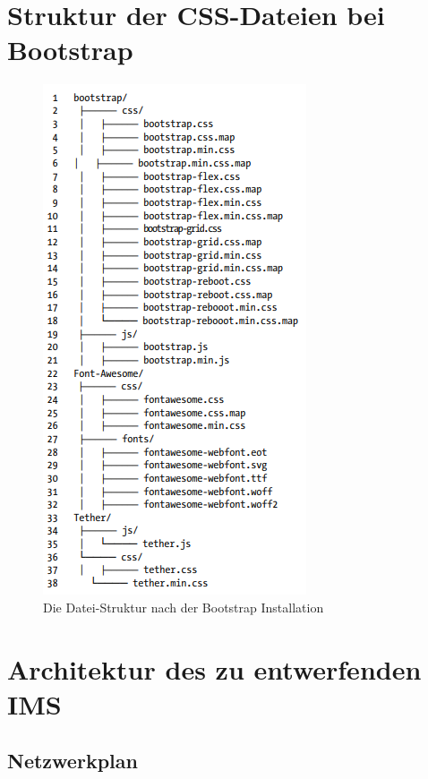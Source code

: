 \documentclass[a4paper,titlepage,halfparskip,12pt]{scrreprt}
\begin{document}
\chapter{Struktur der CSS-Dateien bei Bootstrap}
\begin{figure}[h]
	\centering
	\includegraphics[width=.50\linewidth]{images/BootstrapStructer}
	\caption{Die Datei-Struktur nach der Bootstrap Installation}
	\label{img:BootstrapStructer}
\end{figure}

\chapter{Architektur des zu entwerfenden \ac{IMS}}

\section{Netzwerkplan}
\end{document}
